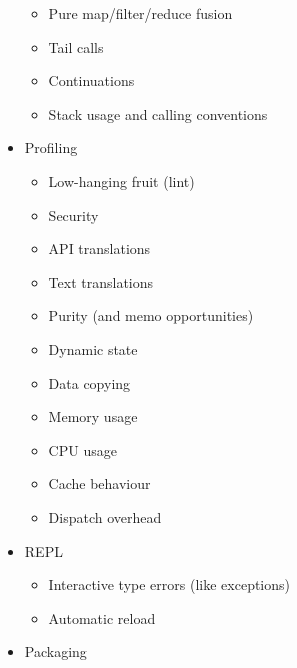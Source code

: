 \begin{itemize}
\begin{itemize}
  \item Pure map/filter/reduce fusion

  \item Tail calls

  \item Continuations

  \item Stack usage and calling conventions

  \end{itemize}

\item Profiling

  \begin{itemize}

  \item Low-hanging fruit (lint)

  \item Security

  \item API translations

  \item Text translations

  \item Purity (and memo opportunities)

  \item Dynamic state

  \item Data copying

  \item Memory usage

  \item CPU usage

  \item Cache behaviour

  \item Dispatch overhead

  \end{itemize}

\item REPL

  \begin{itemize}

  \item Interactive type errors (like exceptions)

  \item Automatic reload

  \end{itemize}

\item Packaging


\end{itemize}
